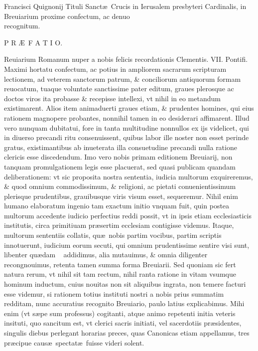 \documentclass[a5paper,10pt]{book}
\def\ae{æ}
\def\AE{Æ}
\begin{document}
\begin{center} \large
Francisci Quignonij Tituli Sanct\ae \ Crucis in Ierusalem presbyteri Cardinalis, in Breuiarium proxime confectum, ac denuo \\ recognitum.
\end{center}
\vspace{+.25em}
\centerline{\Large \color{red} P R \AE \ F A T I O.}
\bookmark[dest=Preface]{PR\AE FATIO}
\vspace{+1em}

Reuiarium Romanum nuper a nobis felicis recordationis Clementis. VII. Pontifi. Maximi hortatu confectum, ac potius in ampliorem sacrarum scripturam lectionem, ad veterem sanctorum patrum, \& conciliorum antiquorum formam reuocatum, tuaque voluntate sanctissime pater editum, graues plerosque ac doctos viros ita probasse \& recepisse intellexi, vt nihil in eo metandum existimarent.
Alios item animaduerti graues etiam, \& prudentes homines, qui eius rationem magnopere probantes, nonnihil tamen in eo desiderari affimarent.
Illud vero nunquam dubitatui, fore in tanta multitudine nonnullos ex ijs videlicet, qui in diuerso precandi ritu consenuissent, quibus labor ille noster non esset perinde gratus, existimantibus ab inueterata illa consuetudine precandi nulla ratione clericis esse discedendum.
Imo vero nobis primam editionem Breuiarij, non tanquam promulgationem legis esse placuerat, sed quasi publicam quandam deliberationem:
vt sic proposita nostra sententia, iudicia multorum exquireremus, \& quod omnium commodissimum, \& religioni, ac pietati conuenientissimum plerisque prudentibus, grauibusque viris visum esset, sequeremur.
Nihil enim humano elaboratum ingenio tam exactum initio vnquam fuit, quin postea multorum accedente iudicio perfectius reddi possit, vt in ipsis etiam ecclesiasticis institutis, circa primitiuam pr\ae sertim ecclesiam contigisse videmus.
Itaque, multorum sententiis 
collatis, qu\ae \ nobis partim vocibus, partim scriptis innotuerunt, iudicium eorum secuti, qui omnium prudentissime sentire visi sunt, libenter qu\ae dam \ %
addidimus, alia mutauimus, \& omnia diligenter recongnouimus, retenta tamen summa forma Breuiarii.
Sed quoniam sic fert natura rerum, vt nihil sit tam rectum, nihil ranta ratione in vitam vsumque hominum inductum, cuius nouitas non sit aliquibus ingrata, non temere facturi esse videmur, si rationem totius instituti nostri a nobis prius summatim redditam, nunc accuratius recognito Breuiario, paulo latius explicabimus.
Mihi enim (vt s\ae pe sum professus) cogitanti, atque animo repetenti initia veteris insituti, quo sancitum est, vt clerici sacris initiati, vel sacerdotiis pr\ae sidentes, singulis diebus perlegant horarias preces, quas Canonicas etiam appellamus, tres pr\ae cipue caus\ae \ spectat\ae \ fuisse videri solent.
\end{document}
